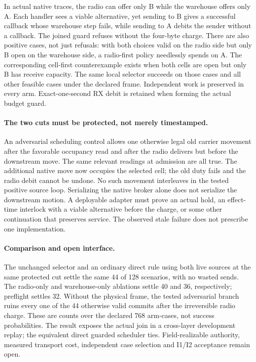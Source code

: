 \documentclass{article}
\begin{document}
In actual native traces, the radio can offer only B while the
warehouse offers only A. Each handler sees a viable alternative,
yet sending to B gives a successful callback whose warehouse step
fails, while sending to A debits the sender without a callback.
The joined guard refuses without the four-byte charge.
There are also positive cases, not just refusals: with both choices
valid on the radio side but only B open on the warehouse side, a
radio-first policy needlessly spends on A. The corresponding
cell-first counterexample exists when both cells are open but only
B has receive capacity. The same local selector succeeds on those
cases and all other feasible cases under the declared frame.
Independent work is preserved in every arm. Exact-one-second RX debit
is retained when forming the actual budget guard.

\paragraph{The two cuts must be protected, not merely timestamped.}
An adversarial scheduling control allows one otherwise legal old
carrier movement after the favorable occupancy read and after the
radio delivers but before the downstream move.
The same relevant readings at admission are all true. The additional
native move now occupies the selected cell; the old duty fails and
the radio debit cannot be undone. No such movement interleaves in the
tested positive source loop. Serializing the native broker alone
does not serialize the downstream motion. A deployable adapter must
prove an actual hold, an effect-time interlock with a viable alternative
before the charge, or some other continuation that preserves service.
The observed stale failure does not prescribe one implementation.

\paragraph{Comparison and open interface.}
The unchanged selector and an ordinary direct rule using both
live sources at the same protected cut settle the same 44 of 128
scenarios, with no wasted sends. The radio-only and warehouse-only
ablations settle 40 and 36, respectively; preflight settles 32.
Without the physical frame, the tested adversarial branch ruins
every one of the 44 otherwise valid commits after the irreversible
radio charge. These are counts over the declared 768 arm-cases, not
success probabilities. The result exposes the actual join in a
cross-layer development replay; the equivalent direct guarded
scheduler ties. Field-realizable authority, measured transport cost,
independent case selection and I1/I2 acceptance remain open.
\end{document}
